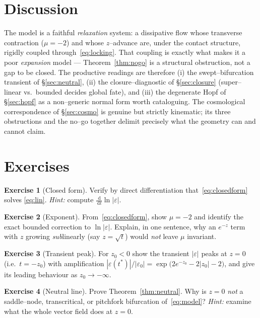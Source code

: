 \documentclass[11pt]{article}
\theoremstyle{plain}
\theoremstyle{definition}
\newtheorem{exercise}{Exercise}
\newcommand{\eps}{\varepsilon}
\newcommand{\dd}{\,\mathrm{d}}
\begin{document}
\section{Discussion}\label{sec:discussion}

The model is a faithful \emph{relaxation} system: a dissipative flow whose
transverse contraction ($\mu=-2$) and whose $z$--advance are, under the contact
structure, rigidly coupled through~\eqref{eq:locking}. That coupling is exactly
what makes it a poor \emph{expansion} model --- Theorem~\ref{thm:nogo} is a
structural obstruction, not a gap to be closed. The productive readings are
therefore (i) the swept--bifurcation transient of \S\ref{sec:neutral}, (ii) the
closure--diagnostic of \S\ref{sec:closure} (super--linear vs.\ bounded decides
global fate), and (iii) the degenerate Hopf of \S\ref{sec:hopf} as a
non--generic normal form worth cataloguing. The cosmological correspondence of
\S\ref{sec:cosmo} is genuine but strictly kinematic; its three obstructions and
the no--go together delimit precisely what the geometry can and cannot claim.

\appendix
\section{Exercises}\label{sec:exercises}

\begin{exercise}[Closed form]
Verify by direct differentiation that~\eqref{eq:closedform} solves
\eqref{eq:lin}. \emph{Hint:} compute $\frac{\dd}{\dd t}\ln|\eps|$.
\end{exercise}

\begin{exercise}[Exponent]
From~\eqref{eq:closedform}, show $\mu=-2$ and identify the exact bounded
correction to $\ln|\eps|$. Explain, in one sentence, why an $e^{-z}$ term with
$z$ growing \emph{sub}linearly (say $z=\sqrt t$) would \emph{not} leave $\mu$
invariant.
\end{exercise}

\begin{exercise}[Transient peak]
For $z_0<0$ show the transient $|\eps|$ peaks at $z=0$ (i.e.\ $t=-z_0$) with
amplification $|\eps(t^\ast)|/|\eps_0|=\exp\!\bigl(2e^{-z_0}-2|z_0|-2\bigr)$,
and give its leading behaviour as $z_0\to-\infty$.
\end{exercise}

\begin{exercise}[Neutral line]
Prove Theorem~\ref{thm:neutral}. Why is $z=0$ \emph{not} a saddle--node,
transcritical, or pitchfork bifurcation of~\eqref{eq:model}? \emph{Hint:}
examine what the whole vector field does at $z=0$.
\end{exercise}
\end{document}
